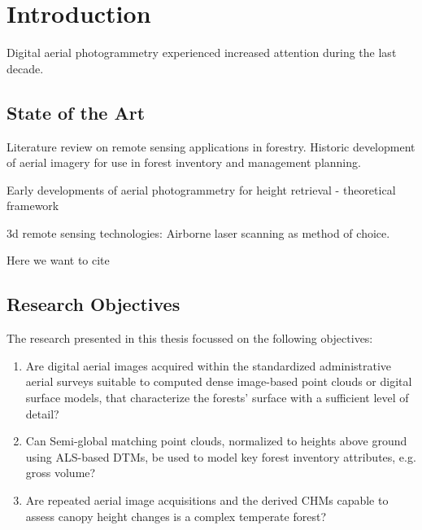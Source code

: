 \chapter{Introduction}
\label{chp:Introduction}

Digital aerial photogrammetry experienced increased attention during the last decade. 


\section{State of the Art}\label{sec:State}

Literature review on remote sensing applications in forestry. Historic development of aerial imagery for use in forest inventory and management planning.

Early developments of aerial photogrammetry for height retrieval - theoretical framework

3d remote sensing technologies: Airborne laser scanning as method of choice.

Here we want to cite \cite{Stepper.2015b}




\section{Research Objectives}\label{sec:Objectives}

The research presented in this thesis focussed on the following objectives:

\begin{enumerate}
	
	\item Are digital aerial images acquired within the standardized administrative aerial surveys suitable to computed dense image-based point clouds or digital surface models, that characterize the forests' surface with a sufficient level of detail?
	
	\item Can Semi-global matching point clouds, normalized to heights above ground using ALS-based DTMs, be used to model key forest inventory attributes, e.g. gross volume?
	
	\item Are repeated aerial image acquisitions and the derived CHMs capable to assess canopy height changes is a complex temperate forest?
	
\end{enumerate}





